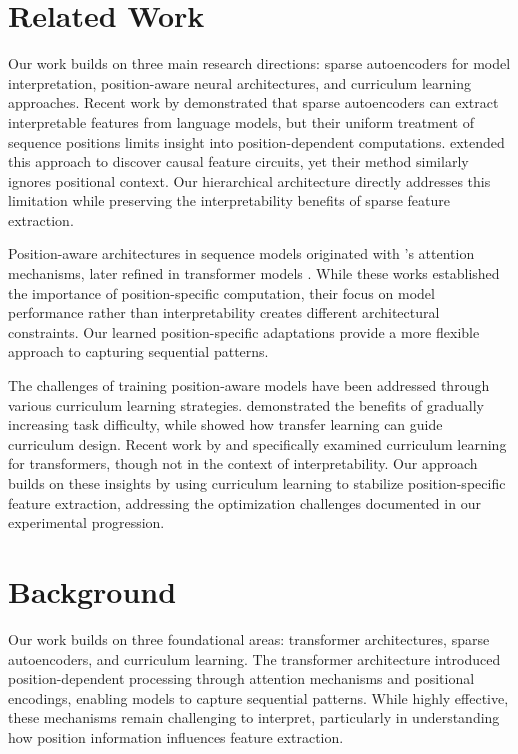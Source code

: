 \documentclass{article} %
\begin{document}
\section{Related Work}
\label{sec:related}

Our work builds on three main research directions: sparse autoencoders for model interpretation, position-aware neural architectures, and curriculum learning approaches. Recent work by \cite{Cunningham2023SparseAF} demonstrated that sparse autoencoders can extract interpretable features from language models, but their uniform treatment of sequence positions limits insight into position-dependent computations. \cite{Marks2024SparseFC} extended this approach to discover causal feature circuits, yet their method similarly ignores positional context. Our hierarchical architecture directly addresses this limitation while preserving the interpretability benefits of sparse feature extraction.

Position-aware architectures in sequence models originated with \cite{bahdanau2014neural}'s attention mechanisms, later refined in transformer models \cite{vaswani2017attention}. While these works established the importance of position-specific computation, their focus on model performance rather than interpretability creates different architectural constraints. Our learned position-specific adaptations provide a more flexible approach to capturing sequential patterns.

The challenges of training position-aware models have been addressed through various curriculum learning strategies. \cite{Bengio2009CurriculumL} demonstrated the benefits of gradually increasing task difficulty, while \cite{Weinshall2018CurriculumLB} showed how transfer learning can guide curriculum design. Recent work by \cite{Ranaldi2023ModelingEF} and \cite{Meng2024APU} specifically examined curriculum learning for transformers, though not in the context of interpretability. Our approach builds on these insights by using curriculum learning to stabilize position-specific feature extraction, addressing the optimization challenges documented in our experimental progression.

\section{Background}
\label{sec:background}

Our work builds on three foundational areas: transformer architectures, sparse autoencoders, and curriculum learning. The transformer architecture \cite{vaswani2017attention} introduced position-dependent processing through attention mechanisms and positional encodings, enabling models to capture sequential patterns. While highly effective, these mechanisms remain challenging to interpret, particularly in understanding how position information influences feature extraction.
\end{document}
